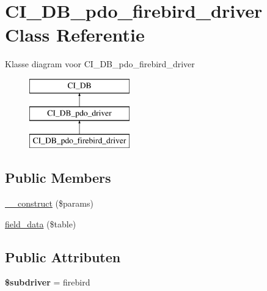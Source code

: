 \hypertarget{class_c_i___d_b__pdo__firebird__driver}{}\section{C\+I\+\_\+\+D\+B\+\_\+pdo\+\_\+firebird\+\_\+driver Class Referentie}
\label{class_c_i___d_b__pdo__firebird__driver}
Klasse diagram voor C\+I\+\_\+\+D\+B\+\_\+pdo\+\_\+firebird\+\_\+driver\begin{figure}[H]
\begin{center}
\leavevmode
\includegraphics[height=3.000000cm]{class_c_i___d_b__pdo__firebird__driver}
\end{center}
\end{figure}
\subsection*{Public Members}
\begin{DoxyCompactItemize}
\item 
\mbox{\hyperlink{class_c_i___d_b__pdo__firebird__driver_a9162320adff1a1a4afd7f2372f753a3e}{\+\_\+\+\_\+construct}} (\$params)
\item 
\mbox{\hyperlink{class_c_i___d_b__pdo__firebird__driver_a90355121e1ed009e0efdbd544ab56efa}{field\+\_\+data}} (\$table)
\end{DoxyCompactItemize}
\subsection*{Public Attributen}
\begin{DoxyCompactItemize}
\item 
\mbox{\label{class_c_i___d_b__pdo__firebird__driver_a1322ca756348b11d080cb7a4f590de15}} 
{\bfseries \$subdriver} = \textquotesingle{}firebird\textquotesingle{}
\end{DoxyCompactItemize}
